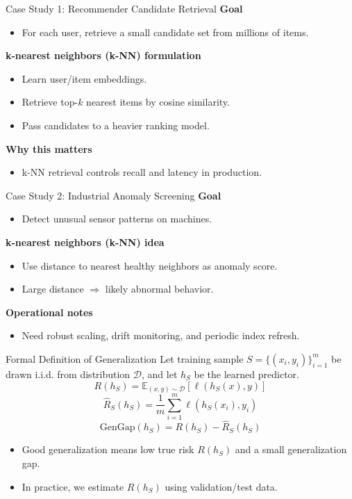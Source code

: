 \begin{frame}{Case Study 1: Recommender Candidate Retrieval}
\textbf{Goal}
\begin{itemize}
  \item For each user, retrieve a small candidate set from millions of items.
\end{itemize}

\pause
\textbf{k-nearest neighbors (k-NN) formulation}
\begin{itemize}
  \item Learn user/item embeddings.
  \pause
  \item Retrieve top-$k$ nearest items by cosine similarity.
  \pause
  \item Pass candidates to a heavier ranking model.
\end{itemize}

\pause
\textbf{Why this matters}
\begin{itemize}
  \item k-NN retrieval controls recall and latency in production.
\end{itemize}
\end{frame}

\begin{frame}{Case Study 2: Industrial Anomaly Screening}
\textbf{Goal}
\begin{itemize}
  \item Detect unusual sensor patterns on machines.
\end{itemize}

\pause
\textbf{k-nearest neighbors (k-NN) idea}
\begin{itemize}
  \item Use distance to nearest healthy neighbors as anomaly score.
  \pause
  \item Large distance $\Rightarrow$ likely abnormal behavior.
\end{itemize}

\pause
\textbf{Operational notes}
\begin{itemize}
  \item Need robust scaling, drift monitoring, and periodic index refresh.
\end{itemize}
\end{frame}

\begin{frame}{Formal Definition of Generalization}
\small
Let training sample $S=\{(x_i,y_i)\}_{i=1}^m$ be drawn i.i.d. from distribution $\mathcal{D}$, and let $h_S$ be the learned predictor.
\pause
\[
R(h_S)=\mathbb{E}_{(x,y)\sim\mathcal{D}}[\ell(h_S(x),y)]
\]
\pause
\[
\hat{R}_S(h_S)=\frac{1}{m}\sum_{i=1}^{m}\ell(h_S(x_i),y_i)
\]
\pause
\[
\text{GenGap}(h_S)=R(h_S)-\hat{R}_S(h_S)
\]
\pause
\begin{itemize}
  \item Good generalization means low true risk \(R(h_S)\) and a small generalization gap.
  \pause
  \item In practice, we estimate \(R(h_S)\) using validation/test data.
\end{itemize}
\end{frame}

